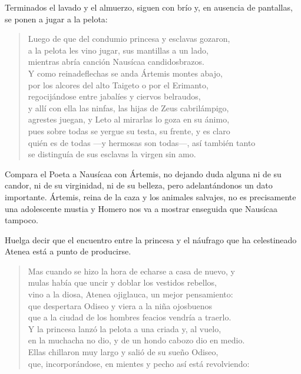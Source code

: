 Terminados el lavado y el almuerzo, siguen con brío y, en ausencia de pantallas, se ponen a jugar a la pelota:

\begin{verse}
Luego de que del condumio princesa y esclavas gozaron,\\
a la pelota les vino jugar, sus mantillas a un lado,\\
mientras abría canción Nausícaa candidosbrazos.\\
Y como reinadeflechas se anda Ártemis montes abajo,\\
por los alcores del alto Taigeto o por el Erimanto,\\
regocijándose entre jabalíes y ciervos belraudos,\\
y allí con ella las ninfas, las hijas de Zeus cabrilámpigo,\\
agrestes juegan, y Leto al mirarlas lo goza en su ánimo,\\
pues sobre todas se yergue su testa, su frente, y es claro\\
quién es de todas ---y hermosas son todas---, así también tanto\\
se distinguía de sus esclavas la virgen sin amo.
\end{verse}

Compara el Poeta a Nausícaa con Ártemis, no dejando duda alguna ni de su candor, ni de su virginidad, ni de su belleza, pero adelantándonos un dato importante. Ártemis, reina de la caza y los animales salvajes, no es precisamente una adolescente mustia y Homero nos va a mostrar enseguida que Nausícaa tampoco.

Huelga decir que el encuentro entre la princesa y el náufrago que ha celestineado Atenea está a punto de producirse.

\begin{verse}
Mas cuando se hizo la hora de echarse a casa de nuevo, y\\
mulas había que uncir y doblar los vestidos rebellos,\\
vino a la diosa, Atenea ojiglauca, un mejor pensamiento:\\
que despertara Odiseo y viera a la niña ojosbuenos\\
que a la ciudad de los hombres feacios vendría a traerlo.\\
Y la princesa lanzó la pelota a una criada y, al vuelo,\\
en la muchacha no dio, y de un hondo cabozo dio en medio.\\
Ellas chillaron muy largo y salió de su sueño Odiseo,\\
que, incorporándose, en mientes y pecho así está revolviendo:
\end{verse}


